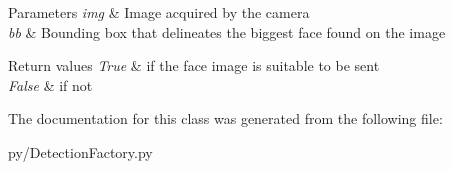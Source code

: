 \begin{DoxyParams}{Parameters}
{\em img} & Image acquired by the camera \\
\hline
{\em bb} & Bounding box that delineates the biggest face found on the image\\
\hline
\end{DoxyParams}

\begin{DoxyRetVals}{Return values}
{\em True} & if the face image is suitable to be sent \\
\hline
{\em False} & if not \\
\hline
\end{DoxyRetVals}


The documentation for this class was generated from the following file\+:\begin{DoxyCompactItemize}
\item 
py/Detection\+Factory.\+py\end{DoxyCompactItemize}
